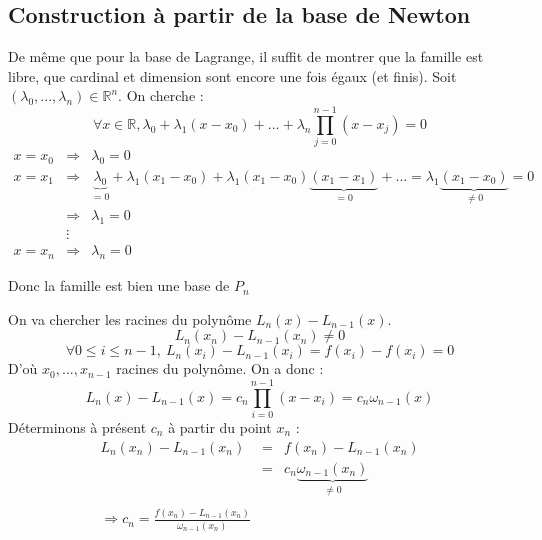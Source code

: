 \subsection{Construction à partir de la base de Newton}

\begin{dem}
De même que pour la base de Lagrange, il suffit de montrer que la famille est libre, que cardinal et dimension sont encore une fois égaux (et finis).
Soit $(\lambda_0,...,\lambda_n)\in\mathbb{R}^n$. On cherche :
\[\forall x\in \mathbb{R}, \lambda_0 +\lambda_1(x-x_0) +... + \lambda_n \prod_{j=0}^{n-1} (x-x_j) = 0\]
\begin{eqnarray*}
x=x_0 &\Rightarrow& \lambda_0 = 0 \\
x=x_1 &\Rightarrow& \underbrace{\lambda_0}_{=0} + \lambda_1(x_1-x_0) + \lambda_1(x_1-x_0)\underbrace{(x_1-x_1)}_{=0}+... = \lambda_1\underbrace{(x_1-x_0)}_{\neq 0} = 0 \\
      &\Rightarrow& \lambda_1 = 0 \\
      &\vdots& \\
x=x_n &\Rightarrow& \lambda_n = 0
\end{eqnarray*}

Donc la famille est bien une base de $P_n$
\end{dem}


\begin{dem}
On va chercher les racines du polynôme $L_n(x)-L_{n-1}(x)$.
\[L_n(x_n)-L_{n-1}(x_n) \neq 0\]
\[\forall 0\leq i \leq n-1,\ L_n(x_i) - L_{n-1}(x_i) = f(x_i)-f(x_i) = 0\]
D'où $x_0,...,x_{n-1}$ racines du polynôme. On a donc : 
\[L_n(x) - L_{n-1}(x)=c_n \prod_{i=0}^{n-1} (x-x_i) = c_n \omega_{n-1}(x)\]
Déterminons à présent $c_n$ à partir du point $x_n$ : 
\begin{eqnarray*}
L_n(x_n)-L_{n-1}(x_n) &=& f(x_n) - L_{n-1}(x_n) \\
		      &=& c_n \underbrace{\omega_{n-1}(x_n)}_{\neq 0} \\
\\
\Rightarrow c_n = \frac{f(x_n)-L_{n-1}(x_n)}{\omega_{n-1}(x_n)}
\end{eqnarray*}
\end{dem}

